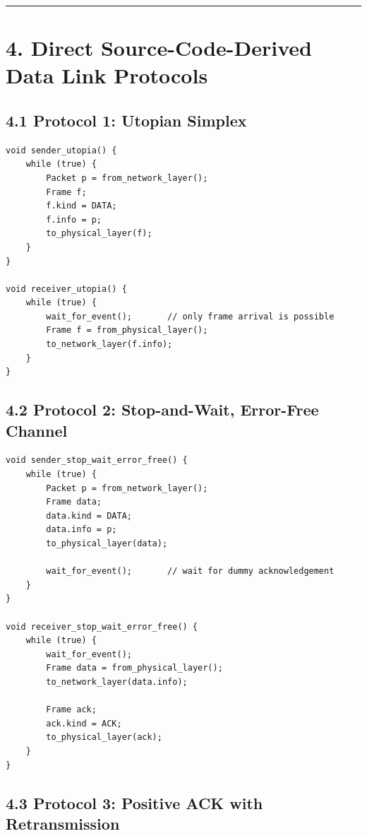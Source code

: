 \documentclass[11pt]{article}
\begin{document}
\begin{center}\rule{0.5\linewidth}{0.5pt}\end{center}

\section{4. Direct Source-Code-Derived Data Link
Protocols}\label{direct-source-code-derived-data-link-protocols}

\subsection{4.1 Protocol 1: Utopian
Simplex}\label{protocol-1-utopian-simplex}

\begin{verbatim}
void sender_utopia() {
    while (true) {
        Packet p = from_network_layer();
        Frame f;
        f.kind = DATA;
        f.info = p;
        to_physical_layer(f);
    }
}

void receiver_utopia() {
    while (true) {
        wait_for_event();       // only frame arrival is possible
        Frame f = from_physical_layer();
        to_network_layer(f.info);
    }
}
\end{verbatim}

\subsection{4.2 Protocol 2: Stop-and-Wait, Error-Free
Channel}\label{protocol-2-stop-and-wait-error-free-channel}

\begin{verbatim}
void sender_stop_wait_error_free() {
    while (true) {
        Packet p = from_network_layer();
        Frame data;
        data.kind = DATA;
        data.info = p;
        to_physical_layer(data);

        wait_for_event();       // wait for dummy acknowledgement
    }
}

void receiver_stop_wait_error_free() {
    while (true) {
        wait_for_event();
        Frame data = from_physical_layer();
        to_network_layer(data.info);

        Frame ack;
        ack.kind = ACK;
        to_physical_layer(ack);
    }
}
\end{verbatim}

\subsection{4.3 Protocol 3: Positive ACK with
Retransmission}\label{protocol-3-positive-ack-with-retransmission}
\end{document}
